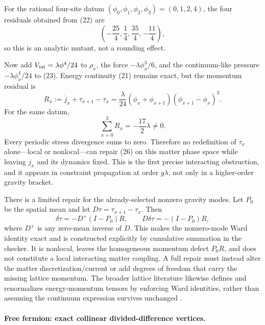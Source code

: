 For the rational four-site datum
$(\phi_0,\phi_1,\phi_2,\phi_3)=(0,1,2,4)$, the four residuals obtained from
(22) are
\[
 \left(-\frac{25}{4},\frac14,\frac{35}{4},-\frac{11}{4}\right),             \tag{25}
\]
so this is an analytic mutant, not a rounding effect.

Now add $V_{\rm int}=\lambda\phi^4/24$ to $\rho_x$, the force
$-\lambda\phi_x^3/6$, and the continuum-like pressure
$-\lambda\phi_x^4/24$ to (23).  Energy continuity (21) remains exact, but
the momentum residual is
\[
 R_x:=\dot j_x+\tau_{x+1}-\tau_x
 =\frac{\lambda}{24}(\phi_x+\phi_{x+1})
   (\phi_{x+1}-\phi_x)^3.                          \tag{26}
\]
For the same datum,
\[
 \sum_{x=0}^{3}R_x=-\frac{17}{2}\lambda\ne0.      \tag{27}
\]
Every periodic stress divergence sums to zero.  Therefore no redefinition of
$\tau_x$ alone---local or nonlocal---can repair (26) on this matter phase
space while leaving $j_x$ and its dynamics fixed.  This is the first precise
interacting obstruction, and it appears in constraint propagation at order
$g\lambda$, not only in a higher-order gravity bracket.

There is a limited repair for the already-selected nonzero gravity modes.  Let
$P_0$ be the spatial mean and let $D\tau=\tau_{x+1}-\tau_x$.  Then
\[
 \delta\tau=-D^+(I-P_0)R,\qquad
 D\delta\tau=-(I-P_0)R,                            \tag{28}
\]
where $D^+$ is any zero-mean inverse of $D$.  This makes the nonzero-mode Ward
identity exact and is constructed explicitly by cumulative summation in the
checker.  It is nonlocal, leaves the homogeneous momentum defect $P_0R$, and
does not constitute a local interacting matter coupling.  A full repair must
instead alter the matter discretization/current or add degrees of freedom that
carry the missing lattice momentum.  The broader lattice literature likewise
defines and renormalizes energy-momentum tensors by enforcing Ward identities,
rather than assuming the continuum expression survives unchanged
\cite{toe-r7-matter-BuonannoCellaCurci,toe-r7-matter-GiustiPepe}.

\paragraph{Free fermion: exact collinear divided-difference vertices.}

